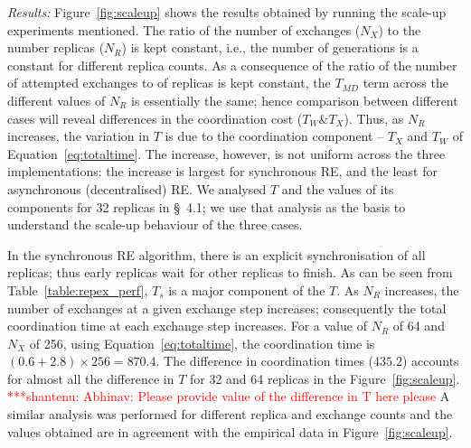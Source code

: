 \documentclass{rspublic}
\newcommand{\jhanote}[1]{ {\textcolor{red} { ***shantenu: #1 }}}
\newcommand{\jhanote}[1]{}
\begin{document}

{\it Results:} Figure~\ref{fig:scaleup} shows the results obtained by
running the scale-up experiments mentioned.  The ratio of the number
of exchanges ($N_X$) to the number replicas ($N_R$) is kept constant,
i.e., the number of generations is a constant for different replica
counts.  As a consequence of the ratio of the number of attempted
exchanges to of replicas is kept constant, the $T_{MD}$ term across
the different values of $N_R$ is essentially the same; hence
comparison between different cases will reveal differences in the
coordination cost ($T_W \& T_X$).  Thus, as $N_R$ increases, the
variation in $T$ is due to the coordination component -- $T_X$ and
$T_W$ of Equation~\ref{eq:totaltime}.  The increase, however, is not
uniform across the three implementations: the increase is largest for
synchronous RE, and the least for asynchronous (decentralised) RE.  We
analysed $T$ and the values of its components for 32 replicas in
\S~4.1; we use that analysis as the basis to understand the scale-up
behaviour of the three cases.
 
In the synchronous RE algorithm, there is an explicit synchronisation
of all replicas; thus early replicas wait for other replicas to
finish. As can be seen from Table~\ref{table:repex_perf}, $T_s$ is a
major component of the $T$.  As $N_R$ increases, the number of
exchanges at a given exchange step increases; consequently the total
coordination time at each exchange step increases.  For a value of
$N_R$ of 64 and $N_X$ of 256, using Equation~\ref{eq:totaltime}, the
coordination time is $(0.6+2.8) \times 256 = 870.4$.  The difference
in coordination times ($435.2$) accounts for almost all the difference
in $T$ for 32 and 64 replicas in the
Figure~\ref{fig:scaleup}. \jhanote{Abhinav: Please provide value of
  the difference in T here please} A similar analysis was performed
for different replica and exchange counts and the values obtained are
in agreement with the empirical data in Figure~\ref{fig:scaleup}.

\end{document}
